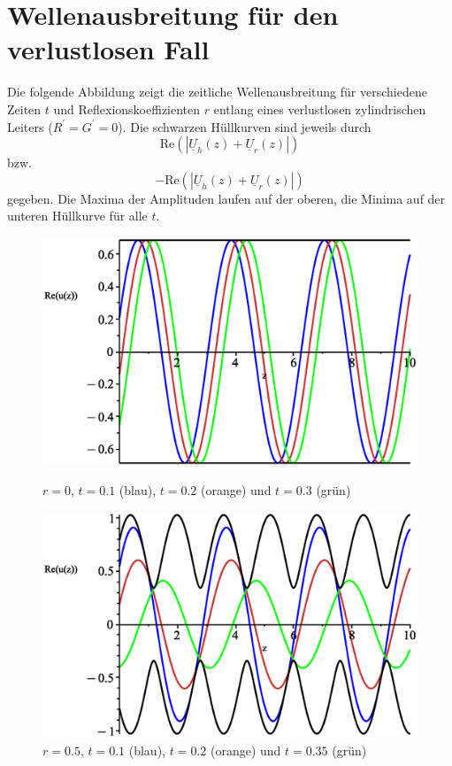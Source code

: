 \documentclass[paper=a4, parskip=half-, ngerman, fontsize=11pt]{scrreprt}
\begin{document}
\appendix

\chapter{Wellenausbreitung für den verlustlosen Fall}
Die folgende Abbildung zeigt die zeitliche Wellenausbreitung für verschiedene Zeiten $t$ und Reflexionskoeffizienten
$r$ entlang eines verlustlosen zylindrischen Leiters (\mbox{$R^{\prime} = G^{\prime} = 0$}). Die schwarzen Hüllkurven
sind
jeweils durch \[
\mathrm{Re} ( \left| \underline{U}_{h}(z) + \underline{U}_{r}(z) \right| )
\] bzw. \[
- \mathrm{Re} ( \left| \underline{U}_{h}(z) + \underline{U}_{r}(z) \right| )
\] gegeben. Die Maxima der Amplituden laufen auf der oberen, die Minima auf der unteren Hüllkurve für alle $t$.
\begin{figure}[H]
    \begin{minipage}{0.45\textwidth}
        \centering
        \includegraphics[width=\linewidth]{../graphics/Enveloppe/verlustlos/R0}
        \caption*{$r=0$, $t=0.1$ (blau), $t=0.2$ (orange) und $t=0.3$ (grün)}
    \end{minipage}\hfill
    \begin{minipage}{0.45\textwidth}
        \centering
        \includegraphics[width=\linewidth]{../graphics/Enveloppe/verlustlos/R0.5}
        \caption*{$r=0.5$, $t=0.1$ (blau), $t=0.2$ (orange) und $t=0.35$ (grün)}
    \end{minipage}


\end{figure}
\end{document}
